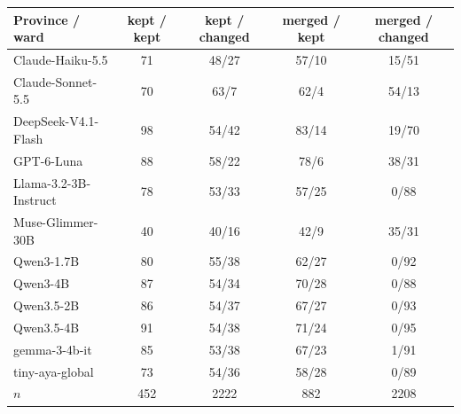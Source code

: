 \begin{tabular}{@{}l cccc@{}}
\toprule
Province / ward & kept / kept & kept / changed & merged / kept & merged / changed \\
\midrule
Claude-Haiku-5.5 & 71 & 48/27 & 57/10 & 15/51 \\
Claude-Sonnet-5.5 & 70 & 63/7 & 62/4 & 54/13 \\
DeepSeek-V4.1-Flash & 98 & 54/42 & 83/14 & 19/70 \\
GPT-6-Luna & 88 & 58/22 & 78/6 & 38/31 \\
Llama-3.2-3B-Instruct & 78 & 53/33 & 57/25 & 0/88 \\
Muse-Glimmer-30B & 40 & 40/16 & 42/9 & 35/31 \\
Qwen3-1.7B & 80 & 55/38 & 62/27 & 0/92 \\
Qwen3-4B & 87 & 54/34 & 70/28 & 0/88 \\
Qwen3.5-2B & 86 & 54/37 & 67/27 & 0/93 \\
Qwen3.5-4B & 91 & 54/38 & 71/24 & 0/95 \\
gemma-3-4b-it & 85 & 53/38 & 67/23 & 1/91 \\
tiny-aya-global & 73 & 54/36 & 58/28 & 0/89 \\
\midrule
$n$ & 452 & 2222 & 882 & 2208 \\
\bottomrule
\end{tabular}
